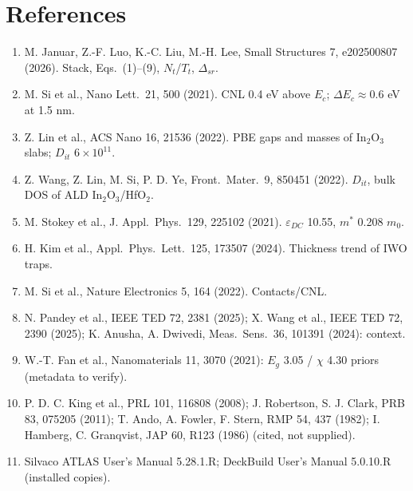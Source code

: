 \documentclass[11pt,a4paper]{article}
\begin{document}
\section{References}
\begin{enumerate}[leftmargin=*,itemsep=0pt]\small
\item M. Januar, Z.-F. Luo, K.-C. Liu, M.-H. Lee, Small Structures 7, e202500807 (2026). Stack, Eqs.\ (1)--(9), $N_t$/$T_t$, $\Delta_{sr}$.
\item M. Si et al., Nano Lett.\ 21, 500 (2021). CNL 0.4 eV above $E_c$; $\Delta E_c\approx0.6$ eV at 1.5 nm.
\item Z. Lin et al., ACS Nano 16, 21536 (2022). PBE gaps and masses of In$_2$O$_3$ slabs; $D_{it}$ $6\times10^{11}$.
\item Z. Wang, Z. Lin, M. Si, P. D. Ye, Front.\ Mater.\ 9, 850451 (2022). $D_{it}$, bulk DOS of ALD In$_2$O$_3$/HfO$_2$.
\item M. Stokey et al., J. Appl.\ Phys.\ 129, 225102 (2021). $\varepsilon_{DC}$ 10.55, $m^*$ 0.208 $m_0$.
\item H. Kim et al., Appl.\ Phys.\ Lett.\ 125, 173507 (2024). Thickness trend of IWO traps.
\item M. Si et al., Nature Electronics 5, 164 (2022). Contacts/CNL.
\item N. Pandey et al., IEEE TED 72, 2381 (2025); X. Wang et al., IEEE TED 72, 2390 (2025); K. Anusha, A. Dwivedi, Meas.\ Sens.\ 36, 101391 (2024): context.
\item W.-T. Fan et al., Nanomaterials 11, 3070 (2021): $E_g$ 3.05 / $\chi$ 4.30 priors (metadata to verify).
\item P. D. C. King et al., PRL 101, 116808 (2008); J. Robertson, S. J. Clark, PRB 83, 075205 (2011); T. Ando, A. Fowler, F. Stern, RMP 54, 437 (1982); I. Hamberg, C. Granqvist, JAP 60, R123 (1986) (cited, not supplied).
\item Silvaco ATLAS User's Manual 5.28.1.R; DeckBuild User's Manual 5.0.10.R (installed copies).
\end{enumerate}
\end{document}

